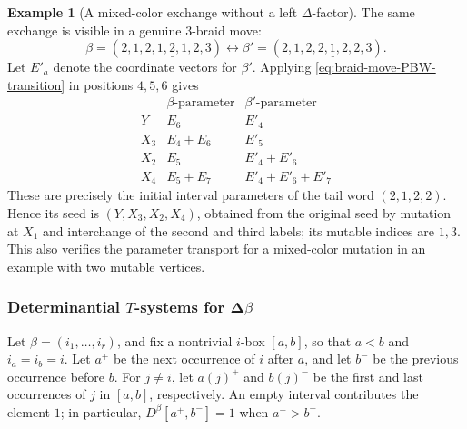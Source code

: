 \documentclass[12pt, reqno]{amsart}
\theoremstyle{plain}
\theoremstyle{definition}
\newtheorem{example}[theorem]{Example}
\numberwithin{equation}{section}
\begin{document}
\begin{example}[A mixed-color exchange without a left \(\Delta\)-factor]
The same exchange is visible in a genuine \(3\)-braid move:
\[
 \beta=(2,1,2,\underline{1,2,1},2,3)
 \longleftrightarrow
 \beta'=(2,1,2,\underline{2,1,2},2,3).
\]
Let \(E'_a\) denote the coordinate vectors for \(\beta'\).
Applying \eqref{eq:braid-move-PBW-transition} in positions
\(4,5,6\) gives
\[
\begin{array}{c|c|c}
 &\beta\text{-parameter}&\beta'\text{-parameter}\\ \hline
 Y&E_6&E'_4\\
 X_3&E_4+E_6&E'_5\\
 X_2&E_5&E'_4+E'_6\\
 X_4&E_5+E_7&E'_4+E'_6+E'_7
\end{array}
\]
These are precisely the initial interval parameters of the tail
word \((2,1,2,2)\). Hence its seed is
\((Y,X_3,X_2,X_4)\), obtained from the original seed by mutation
at \(X_1\) and interchange of the second and third labels;
its mutable indices are \(1,3\).
This also verifies the parameter transport for a mixed-color
mutation in an example with two mutable vertices.
\end{example}


\subsubsection{Determinantial
\texorpdfstring{\(T\)}{T}-systems for
\texorpdfstring{\(\boldsymbol\Delta\beta\)}{Delta beta}}
\label{sec:determinantial-T-system}

Let \(\beta=(i_1,\ldots,i_r)\), and fix a nontrivial
\(i\)-box \([a,b]\), so that \(a<b\) and \(i_a=i_b=i\).
Let \(a^+\) be the next occurrence of \(i\) after \(a\), and
let \(b^-\) be the previous occurrence before \(b\). For
\(j\neq i\), let \(a(j)^+\) and \(b(j)^-\) be the first and
last occurrences of \(j\) in \([a,b]\), respectively. An empty
interval contributes the element \(1\); in particular,
\(D^\beta[a^+,b^-]=1\) when \(a^+>b^-\).
\end{document}
